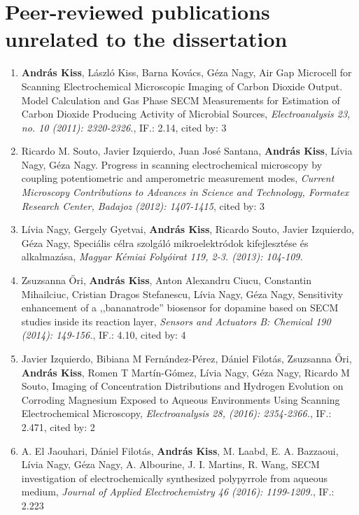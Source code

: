 \documentclass[11pt,a4paper,roman]{article}
\begin{document}
\section{Peer-reviewed publications unrelated to the dissertation}
\begin{enumerate}
\item \textbf{András Kiss}, László Kiss, Barna Kovács, Géza Nagy, Air Gap Microcell for Scanning Electrochemical Microscopic Imaging of Carbon Dioxide Output. Model Calculation and Gas Phase SECM Measurements for Estimation of Carbon Dioxide Producing Activity of Microbial Sources, \emph{Electroanalysis 23, no. 10 (2011): 2320-2326.}, IF.: 2.14, cited by: 3

\item Ricardo M. Souto, Javier Izquierdo, Juan José Santana, \textbf{András Kiss}, Lívia Nagy, Géza Nagy. Progress in scanning electrochemical microscopy by coupling potentiometric and amperometric measurement modes, \emph{Current Microscopy Contributions to Advances in Science and Technology, Formatex Research Center, Badajoz (2012): 1407-1415}, cited by: 3

\item Lívia Nagy, Gergely Gyetvai, \textbf{András Kiss}, Ricardo Souto, Javier Izquierdo, Géza Nagy, Speciális célra szolgáló mikroelektródok kifejlesztése és alkalmazása, \emph{Magyar Kémiai Folyóirat 119, 2-3. (2013): 104-109.}

\item Zsuzsanna \H{O}ri, \textbf{András Kiss}, Anton Alexandru Ciucu, Constantin Mihailciuc, Cristian Dragos Stefanescu, Lívia Nagy, Géza Nagy, Sensitivity enhancement of a ,,bananatrode'' biosensor for dopamine based on SECM studies inside its reaction layer, \emph{Sensors and Actuators B: Chemical 190 (2014): 149-156.}, IF.: 4.10, cited by: 4

\item Javier Izquierdo, Bibiana M Fernández-Pérez, Dániel Filotás, Zsuzsanna Őri, \textbf{András Kiss}, Romen T Martín-Gómez, Lívia Nagy, Géza Nagy, Ricardo M Souto, Imaging of Concentration Distributions and Hydrogen Evolution on Corroding Magnesium Exposed to Aqueous Environments Using Scanning Electrochemical Microscopy, \emph{Electroanalysis 28, (2016): 2354-2366.}, IF.: 2.471, cited by: 2

\item A. El Jaouhari,  Dániel Filotás, \textbf{András Kiss}, M. Laabd, E. A. Bazzaoui, Lívia Nagy, Géza Nagy, A. Albourine, J. I. Martins, R. Wang, SECM investigation of electrochemically synthesized polypyrrole from aqueous medium, \emph{Journal of Applied Electrochemistry 46 (2016): 1199-1209.}, IF.: 2.223

\end{enumerate}
\end{document}
